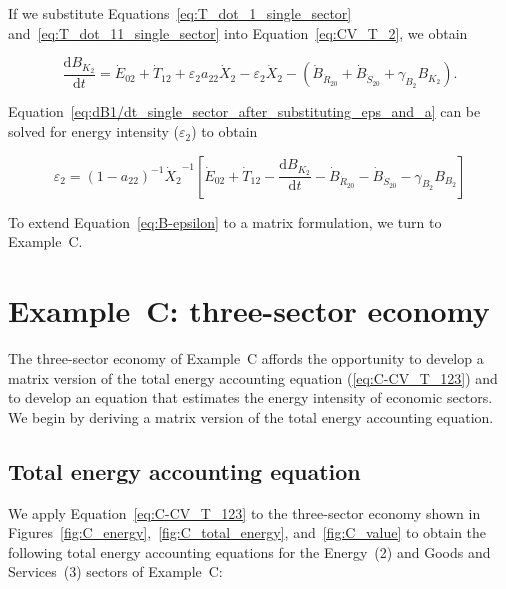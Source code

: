 \noindent{}If we substitute Equations~\ref{eq:T_dot_1_single_sector} 
and~\ref{eq:T_dot_11_single_sector} into Equation~\ref{eq:CV_T_2}, we obtain

\begin{equation} \label{eq:dB1/dt_single_sector_after_substituting_eps_and_a}
	\frac{\mathrm{d}B_{K_{2}}}{\mathrm{d}t} 
	= \dot{E}_{02} 
	+ \dot{T}_{12}
	+ \varepsilon_{2}a_{22}\dot{X}_{2} 
	- \varepsilon_{2}\dot{X}_{2} 
	- \left( \dot{B}_{\dot{R}_{20}} 
							+ \dot{B}_{\dot{S}_{20}}
							+ \gamma_{B_{2}} B_{K_{2}}
							\right).
\end{equation}

Equation~\ref{eq:dB1/dt_single_sector_after_substituting_eps_and_a}
can be solved for energy intensity ($\varepsilon_{2}$) to obtain

\begin{equation} \label{eq:B-epsilon}
	\varepsilon_{2}
	= {(1 - a_{22})}^{-1} {\dot{X}_{2}}^{-1} 
		\left[
			\dot{E}_{02}
			+ \dot{T}_{12}
			- \frac{\mathrm{d}B_{K_{2}}}{\mathrm{d}t} 
			- \dot{B}_{\dot{R}_{20}}
			- \dot{B}_{\dot{S}_{20}}
			- \gamma_{B_{2}} B_{B_{2}}
		\right]
\end{equation}

To extend Equation~\ref{eq:B-epsilon}
to a matrix formulation, we turn to Example~C.


\section{Example~C: three-sector economy} %
\label{sec:C-intensity}

The three-sector economy of Example~C affords the opportunity 
to develop a matrix version 
of the total energy accounting equation (\ref{eq:C-CV_T_123})
and to develop an equation that estimates the
energy intensity of economic sectors. 
We begin by deriving a matrix version of the total energy accounting equation.


\subsection{Total energy accounting equation}

We apply Equation~\ref{eq:C-CV_T_123} to the three-sector
economy shown in 
Figures~\ref{fig:C_energy},~\ref{fig:C_total_energy}, and~\ref{fig:C_value}
to obtain the following total energy accounting equations
for the Energy~(2) and Goods and Services~(3) sectors 
of Example~C: %

